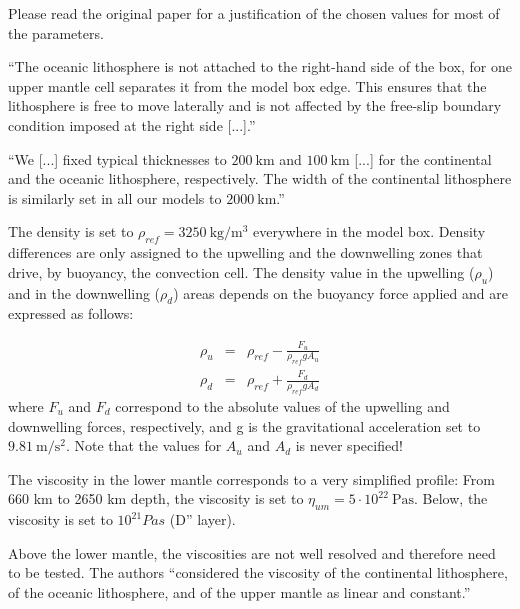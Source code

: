 Please read the original paper for a justification of the chosen values for most 
of the parameters.

``The oceanic lithosphere is not attached
to the right-hand side of the box, for one upper mantle cell
separates it from the model box edge. This ensures that the
lithosphere is free to move laterally and is not affected by
the free-slip boundary condition imposed at the right side [...].''

``We [...] fixed typical thicknesses to
$200~\si{\km}$ and $100~\si{\km}$ [...] for the continental and the oceanic lithosphere, 
respectively. The width of the continental lithosphere is similarly
set in all our models to $2000~\si{\km}$.''

The density is set to $\rho_{ref}=3250~\si{\kg\per\cubic\meter}$ everywhere in the model box. Density
differences are only assigned to the upwelling and the
downwelling zones that drive, by buoyancy, the convection
cell. The density value in the upwelling ($\rho_u$) and
in the downwelling ($\rho_d$) areas depends on the buoyancy force
applied and are expressed as follows:

\begin{eqnarray}
\rho_u &=& \rho_{ref} - \frac{F_u}{\rho_{ref} g A_u} \\
\rho_d &=& \rho_{ref} + \frac{F_d}{\rho_{ref} g A_d} 
\end{eqnarray}
where $F_u$ and $F_d$ correspond to the absolute values of the 
upwelling and downwelling forces, respectively, and g is the gravitational 
acceleration set to $9.81~\si{\meter\per\square\second}$.
Note that the values for $A_u$ and $A_d$ is never specified!


The viscosity in the lower mantle corresponds
to a very simplified profile: From 660 km to 2650 km depth,
the viscosity is set to $\eta_{um}=5\cdot 10^{22}~\si{\pascal\second}$. 
Below, the viscosity is set to $10^{21} Pa s$ (D'' layer). 

Above the lower mantle, the viscosities
are not well resolved and therefore need to be tested.
The authors ``considered the viscosity of the continental 
lithosphere, of the oceanic lithosphere, and of the
upper mantle as linear and constant.''



